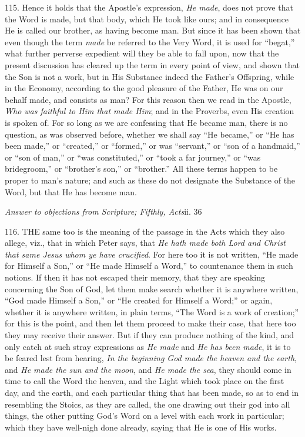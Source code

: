 115. Hence it holds that the
Apostle's expression, \emph{He made}, does not prove that the Word is
made, but that body, which He took like ours; and in consequence He is
called our brother, as having become man. But since it has been shown
that even though the term \emph{made} be referred to the Very Word, it
is used for ``begat,'' what further perverse expedient will they be able
to fall upon, now that the present discussion has cleared up the term
in every point of view, and shown that the Son is not a work, but in
His Substance indeed the Father's Offspring, while in the Economy,
according to the good pleasure of the Father, He was on our behalf
made, and consists as man? For this reason then we read in the
Apostle, \emph{Who was faithful to Him that made Him}; and in the
Proverbs, even His creation is spoken of. For so long as we are
confessing that He became man, there is no question, as was observed
before, whether we shall say ``He became,'' or ``He has been made,'' or ``created,''
or ``formed,'' or was ``servant,'' or ``son of a handmaid,'' or ``son of man,''
or ``was constituted,'' or ``took a far journey,'' or ``was bridegroom,'' or
``brother's son,'' or ``brother.'' All these terms happen to be proper to
man's nature; and such as these do not designate the Substance of the
Word, but that He has become man.


\emph{Answer to
objections from Scripture; Fifthly, Acts}ii. 36

116. THE
same too is the meaning of the passage in the Acts which they also
allege, viz., that in which Peter says, that \emph{He hath made both Lord
and Christ that same Jesus whom ye have crucified}. For here too it
is not written, ``He made for Himself a Son,'' or ``He made Himself a
Word,'' to countenance them in such notions. If then it has not escaped
their memory, that they are speaking concerning the Son of God, let
them make search whether it is anywhere written, ``God made Himself a
Son,'' or ``He created for Himself a Word;'' or again, whether it is
anywhere written, in plain terms, ``The Word is a work of creation;''
for this is the point, and then let them proceed to make their case,
that here too they may receive their answer. But if they can produce
nothing of the kind, and only catch at such stray expressions as \emph{He
made} and \emph{He has been made}, it is to be feared lest from
hearing, \emph{In the beginning God made the heaven and the earth},
and \emph{He made the sun and the moon}, and \emph{He made the sea},
they should come in time to call the Word the heaven, and the Light
which took place on the first day, and the earth, and each particular
thing that has been made, so as to end in resembling the Stoics, as
they are called, the one drawing out their god into all things, the
other putting God's Word on a level with each work in particular;
which they have well-nigh done already, saying that He is one of His
works.

